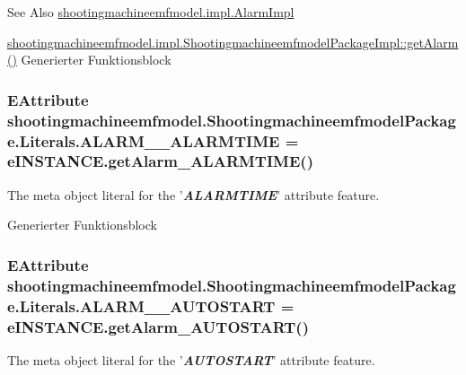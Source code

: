 \begin{DoxySeeAlso}{See Also}
\hyperlink{classshootingmachineemfmodel_1_1impl_1_1_alarm_impl}{shootingmachineemfmodel.\-impl.\-Alarm\-Impl} 

\hyperlink{classshootingmachineemfmodel_1_1impl_1_1_shootingmachineemfmodel_package_impl_aae7572a42a9d2658df63f0aea15ccf62}{shootingmachineemfmodel.\-impl.\-Shootingmachineemfmodel\-Package\-Impl\-::get\-Alarm()} Generierter Funktionsblock 
\end{DoxySeeAlso}
\hypertarget{interfaceshootingmachineemfmodel_1_1_shootingmachineemfmodel_package_1_1_literals_a17abebf837e070e79742d36847ad9d59}{
\subsubsection[{A\-L\-A\-R\-M\-\_\-\-\_\-\-A\-L\-A\-R\-M\-T\-I\-M\-E}]{\setlength{\rightskip}{0pt plus 5cm}E\-Attribute shootingmachineemfmodel.\-Shootingmachineemfmodel\-Package.\-Literals.\-A\-L\-A\-R\-M\-\_\-\-\_\-\-A\-L\-A\-R\-M\-T\-I\-M\-E = e\-I\-N\-S\-T\-A\-N\-C\-E.\-get\-Alarm\-\_\-\-A\-L\-A\-R\-M\-T\-I\-M\-E()}}\label{interfaceshootingmachineemfmodel_1_1_shootingmachineemfmodel_package_1_1_literals_a17abebf837e070e79742d36847ad9d59}
The meta object literal for the '{\itshape {\bfseries A\-L\-A\-R\-M\-T\-I\-M\-E}}' attribute feature.

Generierter Funktionsblock \hypertarget{interfaceshootingmachineemfmodel_1_1_shootingmachineemfmodel_package_1_1_literals_a18cfa31e4eebfe9cb41fabca8febd495}{
\subsubsection[{A\-L\-A\-R\-M\-\_\-\-\_\-\-A\-U\-T\-O\-S\-T\-A\-R\-T}]{\setlength{\rightskip}{0pt plus 5cm}E\-Attribute shootingmachineemfmodel.\-Shootingmachineemfmodel\-Package.\-Literals.\-A\-L\-A\-R\-M\-\_\-\-\_\-\-A\-U\-T\-O\-S\-T\-A\-R\-T = e\-I\-N\-S\-T\-A\-N\-C\-E.\-get\-Alarm\-\_\-\-A\-U\-T\-O\-S\-T\-A\-R\-T()}}\label{interfaceshootingmachineemfmodel_1_1_shootingmachineemfmodel_package_1_1_literals_a18cfa31e4eebfe9cb41fabca8febd495}
The meta object literal for the '{\itshape {\bfseries A\-U\-T\-O\-S\-T\-A\-R\-T}}' attribute feature.

